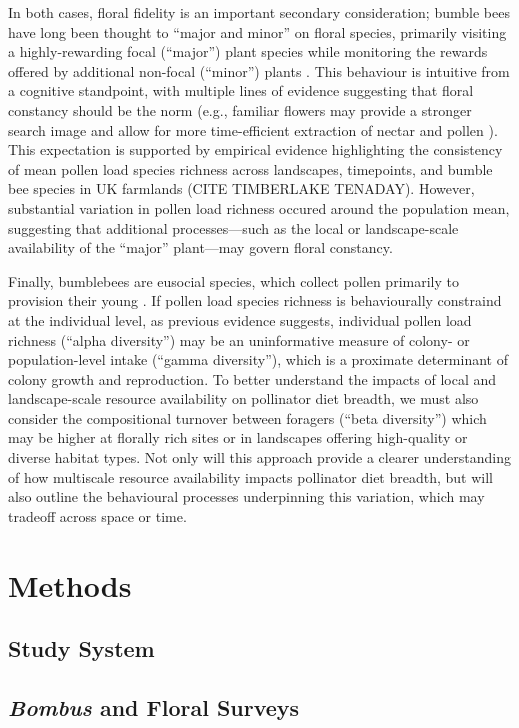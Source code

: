 \documentclass[12pt]{article}
\begin{document}
In both cases, floral fidelity is an important secondary consideration; bumble bees have long been thought to ``major and minor'' on floral species, primarily visiting a highly-rewarding focal (``major'') plant species while monitoring the rewards offered by additional non-focal (``minor'') plants \parencite{heinrichBumblebeeEconomics2004}. This behaviour is intuitive from a cognitive standpoint, with multiple lines of evidence suggesting that floral constancy should be the norm (e.g., familiar flowers may provide a stronger search image and allow for more time-efficient extraction of nectar and pollen \parencite{chittkaMindBee2023}). This expectation is supported by empirical evidence highlighting the consistency of mean pollen load species richness across landscapes, timepoints, and bumble bee species in UK farmlands (CITE TIMBERLAKE TENADAY). However, substantial variation in pollen load richness occured around the population mean, suggesting that additional processes---such as the local or landscape-scale availability of the ``major'' plant---may govern floral constancy.

Finally, bumblebees are eusocial species, which collect pollen primarily to provision their young \parencite{goulsonBumblebeesBehaviourEcology2010}. If pollen load species richness is behaviourally constraind at the individual level, as previous evidence suggests, individual pollen load richness (``alpha diversity'') may be an uninformative measure of colony- or population-level intake (``gamma diversity''), which is a proximate determinant of colony growth and reproduction. To better understand the impacts of local and landscape-scale resource availability on pollinator diet breadth, we must also consider the compositional turnover between foragers (``beta diversity'') which may be higher at florally rich sites or in landscapes offering high-quality or diverse habitat types. Not only will this approach provide a clearer understanding of how multiscale resource availability impacts pollinator diet breadth, but will also outline the behavioural processes underpinning this variation, which may tradeoff across space or time.

\section{Methods}
\subsection{Study System}
\subsection{\emph{Bombus} and Floral Surveys}
\end{document}

